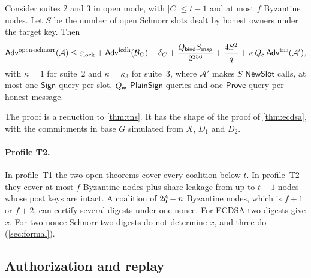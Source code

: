 \begin{theorem}\label{thm:schnorr}
Consider suites 2 and 3 in open mode, with $|C| \le t-1$ and at most $f$ Byzantine nodes. Let $S$ be the number of open Schnorr slots dealt by honest owners under the target key. Then
\[
  \mathsf{Adv}^{\mathrm{open\text{-}schnorr}}(\mathcal{A}) \le \varepsilon_{\mathrm{lock}} + \mathsf{Adv}^{\mathrm{icdh}}(\mathcal{B}_C) + \delta_C + \frac{Q_{\mathsf{bind}} S_{\mathrm{msg}}}{2^{256}} + \frac{4S^2}{q} + \kappa\,Q_{\mathsf{o}}\,\mathsf{Adv}^{\mathrm{tns}}(\mathcal{A}'),
\]
with $\kappa = 1$ for suite~2 and $\kappa = \kappa_3$ for suite~3, where $\mathcal{A}'$ makes $S$ $\mathsf{NewSlot}$ calls, at most one $\mathsf{Sign}$ query per slot, $Q_{\mathsf{w}}$ $\mathsf{PlainSign}$ queries and one $\mathsf{Prove}$ query per honest message.
\end{theorem}

The proof is a reduction to \cref{thm:tns}. It has the shape of the proof of \cref{thm:ecdsa}, with the commitments in base $G$ simulated from $X$, $D_1$ and $D_2$.

\paragraph{Profile T2.} In profile~T1 the two open theorems cover every coalition below $t$. In profile~T2 they cover at most $f$ Byzantine nodes plus share leakage from up to $t-1$ nodes whose post keys are intact. A coalition of $2\hat{q} - n$ Byzantine nodes, which is $f+1$ or $f+2$, can certify several digests under one nonce. For ECDSA two digests give $x$. For two-nonce Schnorr two digests do not determine $x$, and three do (\cref{sec:formal}).

\subsection{Authorization and replay}

